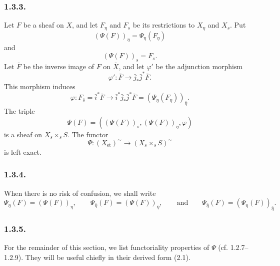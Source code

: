 \subsubsection*{1.3.3.}
Let $F$ be a sheaf on $X$, and let $F_\eta$ and $F_s$ be its
restrictions to $X_\eta$ and $X_s$.  Put
\begin{equation}\tag{1.3.3.1}
(\Psi(F))_\eta=\Psi_\eta(F_\eta)
\end{equation}
and
\begin{equation}\tag{1.3.3.2}
(\Psi(F))_s=F_s.
\end{equation}
Let $\bar F$ be the inverse image of $F$ on $\bar X$, and let
$\varphi'$ be the adjunction morphism
\begin{equation*}
\varphi':\bar F\longrightarrow\bar j_*\bar j^*\bar F.
\end{equation*}
This morphism induces
\begin{equation*}
\varphi:F_{\bar s}=\bar i^*\bar F
\longrightarrow
\bar i^*\bar j_*\bar j^*\bar F
=(\Psi_\eta(F_\eta))_{\bar\eta}.
\end{equation*}
The triple
\begin{equation*}
\Psi(F)=((\Psi(F))_s,(\Psi(F))_\eta,\varphi)
\end{equation*}
is a sheaf on $X_s\times_sS$.  The functor
\begin{equation}\tag{1.3.3.3}
\Psi:(X_{\mathrm{et}})^{\sim}
\longrightarrow(X_s\times_sS)^{\sim}
\end{equation}
is left exact.

\subsubsection*{1.3.4.}
When there is no risk of confusion, we shall write
\begin{equation*}
\Psi_\eta(F)=(\Psi(F))_\eta,
\qquad
\Psi_{\bar\eta}(F)=(\Psi(F))_{\bar\eta},
\qquad\text{and}\qquad
\Psi_{\bar\eta}(F)=(\Psi_\eta(F))_{\bar\eta}.
\end{equation*}

\subsubsection*{1.3.5.}
For the remainder of this section, we list functoriality properties of
$\Psi$ (cf. 1.2.7--1.2.9).  They will be useful chiefly in their
derived form (2.1).

